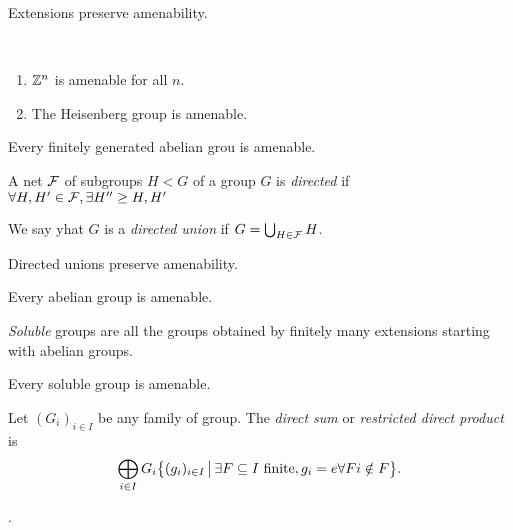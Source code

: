     \begin{proposition}
        Extensions preserve amenability.
    \end{proposition}

    \begin{corollary}~
        \begin{enumerate}
            \item $\mathbb Z^n$ is amenable for all $n$.
            \item The Heisenberg group is amenable.
        \end{enumerate}
    \end{corollary}

    \begin{corollary}
        Every finitely generated abelian grou is amenable.
    \end{corollary}

    \begin{definition}
        A net $\mathcal{F}$ of subgroups $H < G$ of a group $G$
        is \emph{directed} if 
        $\forall H, H' \in \mathcal{F}, \exists H'' \geq H, H'$

        We say yhat $G$ is a \emph{directed union} if
        $G = \bigcup_{H \in \mathcal{F}} H$.
    \end{definition}

    \begin{proposition}
        Directed unions preserve amenability.
    \end{proposition}

    \begin{corollary}
        Every abelian group is amenable.
    \end{corollary}

    \begin{definition}
        \emph{Soluble} groups are all the groups obtained by finitely 
        many extensions starting with abelian groups.
    \end{definition}

    \begin{corollary}
        Every soluble group is amenable.
    \end{corollary}

    \begin{definition}
        Let $(G_i)_{i \in I}$ be any family of group.
        The \emph{direct sum} or \emph{restricted direct product}
        is 
        \[
            \bigoplus_{i \in I} G_i
            \big\{ 
                (g_i)_{i \in I}
             \, \big| \, 
                \exists F \subseteq I \text{ finite},
                g_i = e \forall F i \notin F
             \big\}.
        \]
    \end{definition}
    \newpage
    .

